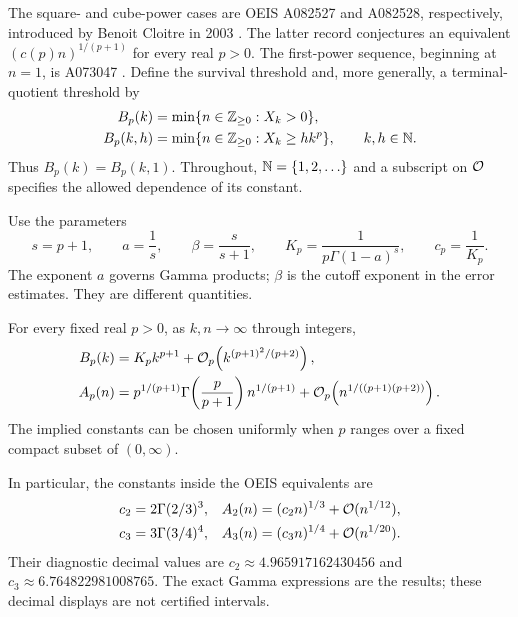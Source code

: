 The square- and cube-power cases are OEIS A082527 and A082528, respectively, introduced by Benoit Cloitre in 2003 \cite{oeis-square,oeis-cube}. The latter record conjectures an equivalent $(c(p)n)^{1/(p+1)}$ for every real $p>0$. The first-power sequence, beginning at $n=1$, is A073047 \cite{oeis-linear}. Define the survival threshold and, more generally, a terminal-quotient threshold by
\begin{align}
 B_p(k)&=\min\{n\in\mathbb Z_{\ge0}:X_k>0\},\label{rex:qt:eq:Bdef}\\
 B_p(k,h)&=\min\{n\in\mathbb Z_{\ge0}:X_k\ge h k^p\},
                  \qquad k,h\in\mathbb N.\label{rex:qt:eq:Bhdef}
\end{align}
Thus $B_p(k)=B_p(k,1)$. Throughout, $\mathbb N=\{1,2,\ldots\}$ and a subscript on $\mathcal O$ specifies the allowed dependence of its constant.

Use the parameters
\begin{equation}\label{rex:qt:eq:params}
 s=p+1,\qquad a=\frac1s,\qquad \beta=\frac{s}{s+1},\qquad
 K_p=\frac1{p\Gamma(1-a)^s},\qquad c_p=\frac1{K_p}.
\end{equation}
The exponent $a$ governs Gamma products; $\beta$ is the cutoff exponent in the error estimates. They are different quantities.

\begin{theorem}\label{rex:qt:thm:main}
For every fixed real $p>0$, as $k,n\to\infty$ through integers,
\begin{align}
 B_p(k)&=K_p k^{p+1}+\mathcal O_p\!\left(k^{(p+1)^2/(p+2)}\right),\label{rex:qt:eq:Bmain}\\
 A_p(n)&=p^{1/(p+1)}\Gamma\!\left(\frac p{p+1}\right)n^{1/(p+1)}
       +\mathcal O_p\!\left(n^{1/((p+1)(p+2))}\right).\label{rex:qt:eq:Amain}
\end{align}
The implied constants can be chosen uniformly when $p$ ranges over a fixed compact subset of $(0,\infty)$.
\end{theorem}

In particular, the constants inside the OEIS equivalents are
\begin{align}
 c_2&=2\Gamma(2/3)^3,&
 A_2(n)&=(c_2n)^{1/3}+\mathcal O(n^{1/12}),\label{rex:qt:eq:p2}\\
 c_3&=3\Gamma(3/4)^4,&
 A_3(n)&=(c_3n)^{1/4}+\mathcal O(n^{1/20}).\label{rex:qt:eq:p3}
\end{align}
Their diagnostic decimal values are $c_2\approx4.965917162430456$ and $c_3\approx6.764822981008765$. The exact Gamma expressions are the results; these decimal displays are not certified intervals.

